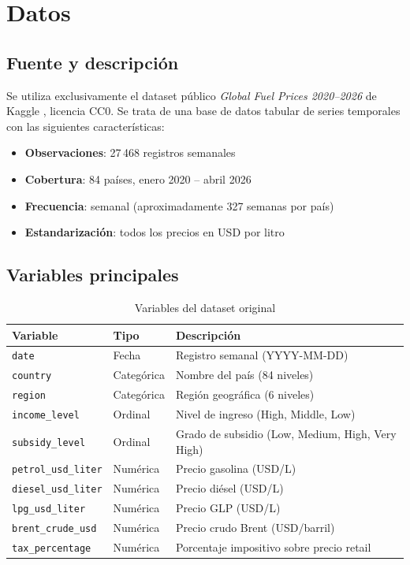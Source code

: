\documentclass[stu, 12pt, a4paper, biblatex, donotrepeattitle]{apa7}
\begin{document}
\section{Datos}

\subsection{Fuente y descripción}

Se utiliza exclusivamente el dataset público \textit{Global Fuel Prices 2020--2026} de Kaggle \parencite{kaggle2024fuel}, licencia CC0. Se trata de una base de datos tabular de series temporales con las siguientes características:

\begin{itemize}
  \item \textbf{Observaciones}: 27\,468 registros semanales
  \item \textbf{Cobertura}: 84 países, enero 2020 -- abril 2026
  \item \textbf{Frecuencia}: semanal (aproximadamente 327 semanas por país)
  \item \textbf{Estandarización}: todos los precios en USD por litro
\end{itemize}

\subsection{Variables principales}

\begin{table}[H]
\centering
\caption{Variables del dataset original}
\label{tab:variables}
\begin{tabular}{lll}
\toprule
\textbf{Variable} & \textbf{Tipo} & \textbf{Descripción} \\
\midrule
\texttt{date} & Fecha & Registro semanal (YYYY-MM-DD) \\
\texttt{country} & Categórica & Nombre del país (84 niveles) \\
\texttt{region} & Categórica & Región geográfica (6 niveles) \\
\texttt{income\_level} & Ordinal & Nivel de ingreso (High, Middle, Low) \\
\texttt{subsidy\_level} & Ordinal & Grado de subsidio (Low, Medium, High, Very High) \\
\texttt{petrol\_usd\_liter} & Numérica & Precio gasolina (USD/L) \\
\texttt{diesel\_usd\_liter} & Numérica & Precio diésel (USD/L) \\
\texttt{lpg\_usd\_liter} & Numérica & Precio GLP (USD/L) \\
\texttt{brent\_crude\_usd} & Numérica & Precio crudo Brent (USD/barril) \\
\texttt{tax\_percentage} & Numérica & Porcentaje impositivo sobre precio retail \\
\bottomrule
\end{tabular}
\end{table}
\end{document}
